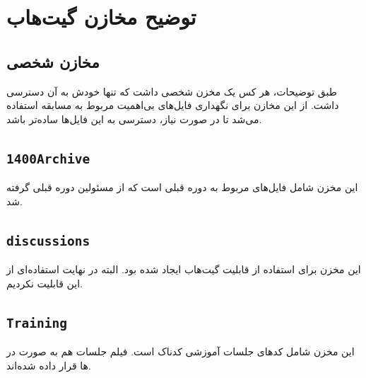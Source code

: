\documentclass{report}
\begin{document}
\appendix
\chapter{توضیح مخازن گیت‌هاب}
\label{ch:توضیح مخازن گیت‌هاب}
\section{مخازن شخصی}
طبق توضیحات، هر کس یک مخزن شخصی داشت که تنها خودش به آن دسترسی داشت. از این مخازن برای نگهداری فایل‌های بی‌اهمیت مربوط به مسابقه استفاده می‌شد تا در صورت نیاز، دسترسی به این فایل‌ها ساده‌تر باشد.

\cprotect\section{\verb|1400Archive|}
این مخزن شامل فایل‌های مربوط به دوره قبلی است که از مسئولین دوره قبلی گرفته شد.
\cprotect\section{\verb|discussions|}
این مخزن برای استفاده از قابلیت  گیت‌هاب ایجاد شده بود. البته در نهایت استفاده‌ای از این قابلیت نکردیم.
\cprotect\section{\verb|Training|}
این مخزن شامل کدهای جلسات آموزشی کدناک است. فیلم جلسات هم به صورت  در ها قرار داده شده‌اند.
\end{document}
